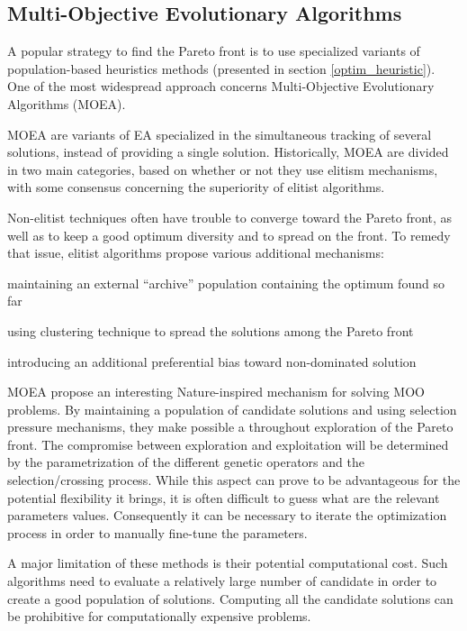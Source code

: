 \subsection{Multi-Objective Evolutionary Algorithms}

A popular strategy to find the Pareto front is to use specialized variants of population-based heuristics methods (presented in section \ref{optim_heuristic}). One of the most widespread approach concerns Multi-Objective Evolutionary Algorithms (MOEA).

MOEA are variants of EA specialized in the simultaneous tracking of several solutions, instead of providing a single solution. Historically, MOEA are divided in two main categories, based on whether or not they use elitism mechanisms, with some consensus concerning the superiority of elitist algorithms.

Non-elitist techniques often have trouble to converge toward the Pareto front, as well as to keep a good optimum diversity and to spread on the front. To remedy that issue, elitist algorithms propose various additional mechanisms:
\begin{compactitem}
\item maintaining an external \enquote{archive} population containing the optimum found so far
\item using clustering technique to spread the solutions among the Pareto front
\item introducing an additional preferential bias toward non-dominated solution
\end{compactitem}

MOEA propose an interesting Nature-inspired mechanism for solving MOO problems. By maintaining a population of candidate solutions and using selection pressure mechanisms, they make possible a throughout exploration of the Pareto front. The compromise between exploration and exploitation will be determined by the parametrization of the different genetic operators and the selection/crossing process. While this aspect can prove to be advantageous for the potential flexibility it brings, it is often difficult to guess what are the relevant parameters values. Consequently it can be necessary to iterate the optimization process in order to manually fine-tune the parameters.

A major limitation of these methods is their potential computational cost. Such algorithms need to evaluate a relatively large number of candidate in order to create a good population of solutions. Computing all the candidate solutions can be prohibitive for computationally expensive problems.

